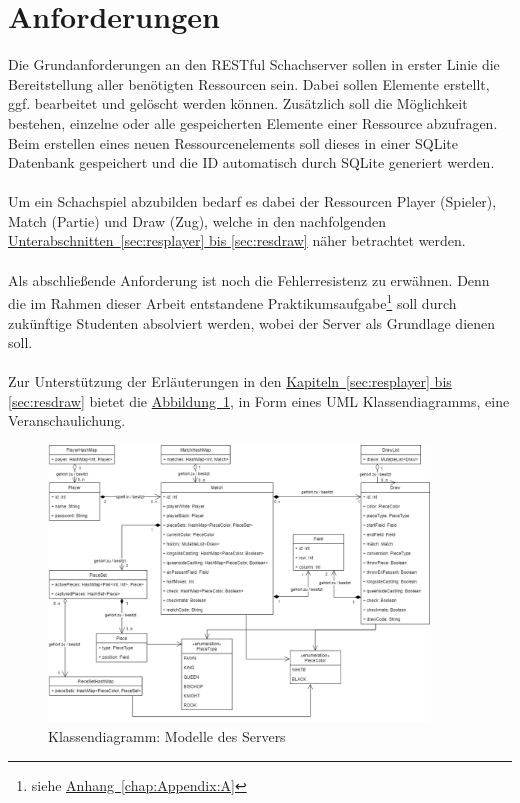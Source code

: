 \section{Anforderungen}\label{sec:anforderungen}
Die Grundanforderungen an den RESTful Schachserver sollen in erster Linie die Bereitstellung aller benötigten Ressourcen sein. Dabei sollen Elemente erstellt, ggf. bearbeitet und gelöscht werden können. Zusätzlich soll die Möglichkeit bestehen, einzelne oder alle gespeicherten Elemente einer Ressource abzufragen. Beim erstellen eines neuen Ressourcenelements soll dieses in einer SQLite Datenbank gespeichert und die ID automatisch durch SQLite generiert werden.\\
\\
Um ein Schachspiel abzubilden bedarf es dabei der Ressourcen Player (Spieler), Match (Partie) und Draw (Zug), welche in den nachfolgenden \hyperref[sec:resplayer, sec:resdraw]{Unterabschnitten~\ref{sec:resplayer} bis \ref{sec:resdraw}} näher betrachtet werden.\\
\\
Als abschließende Anforderung ist noch die Fehlerresistenz zu erwähnen. Denn die im Rahmen dieser Arbeit entstandene Praktikumsaufgabe\footnote{siehe \hyperref[chap:Appendix:A]{Anhang~\ref{chap:Appendix:A}}} soll durch zukünftige Studenten absolviert werden, wobei der Server als Grundlage dienen soll.\\
\\
Zur Unterstützung der Erläuterungen in den \hyperref[sec:resplayer, sec:resdraw]{Kapiteln~\ref{sec:resplayer} bis \ref{sec:resdraw}} bietet die \hyperref[fig:classdiagram]{Abbildung~\ref{fig:classdiagram}}, in Form eines \gls{UML} Klassendiagramms, eine Veranschaulichung.
\begin{figure}
	\includegraphics[width=0.9\textwidth]{images/classdiagram.png}
	\caption{Klassendiagramm: Modelle des Servers}
	\label{fig:classdiagram}
\end{figure}

